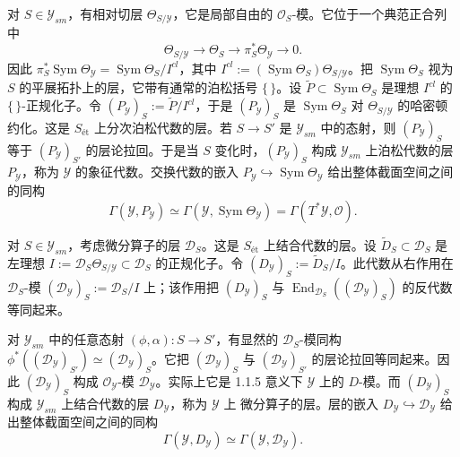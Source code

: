 对 $S\in\mathcal{Y}_{sm}$，有相对切层 $\Theta_{S/\mathcal{Y}}$，它是局部自由的 $\mathcal{O}_S$-模。它位于一个典范正合列中
\[
\Theta_{S/\mathcal{Y}}\to\Theta_S\to\pi_S^{*}\Theta_{\mathcal{Y}}\to 0.
\]
因此 $\pi_S^{*}\operatorname{Sym}\Theta_{\mathcal{Y}}=\operatorname{Sym}\Theta_S/I^{cl}$，其中 $I^{cl}:=(\operatorname{Sym}\Theta_S)\Theta_{S/\mathcal{Y}}$。把 $\operatorname{Sym}\Theta_S$ 视为 $S$ 的平展拓扑上的层，它带有通常的泊松括号 $\{\,\}$。设 $\tilde{P}\subset\operatorname{Sym}\Theta_S$ 是理想 $I^{cl}$ 的 $\{\,\}$-正规化子。令 $(P_{\mathcal{Y}})_S:=\tilde{P}/I^{cl}$，于是 $(P_{\mathcal{Y}})_S$ 是 $\operatorname{Sym}\Theta_S$ 对 $\Theta_{S/\mathcal{Y}}$ 的哈密顿约化。这是 $S_{\text{ét}}$ 上分次泊松代数的层。若 $S\to S'$ 是 $\mathcal{Y}_{sm}$ 中的态射，则 $(P_{\mathcal{Y}})_S$ 等于 $(P_{\mathcal{Y}})_{S'}$ 的层论拉回。于是当 $S$ 变化时，$(P_{\mathcal{Y}})_S$ 构成 $\mathcal{Y}_{sm}$ 上泊松代数的层 $P_{\mathcal{Y}}$，称为 $\mathcal{Y}$ 的象征代数。交换代数的嵌入 $P_{\mathcal{Y}}\hookrightarrow\operatorname{Sym}\Theta_{\mathcal{Y}}$ 给出整体截面空间之间的同构
\begin{equation}\tag{5}
\Gamma(\mathcal{Y},P_{\mathcal{Y}})\simeq\Gamma(\mathcal{Y},\operatorname{Sym}\Theta_{\mathcal{Y}})=\Gamma(T^{*}\mathcal{Y},\mathcal{O}).
\end{equation}

 对 $S\in\mathcal{Y}_{sm}$，考虑微分算子的层 $\mathcal{D}_S$。这是 $S_{\text{ét}}$ 上结合代数的层。设 $\tilde{D}_S\subset\mathcal{D}_S$ 是左理想 $I:=\mathcal{D}_S\Theta_{S/\mathcal{Y}}\subset\mathcal{D}_S$ 的正规化子。令 $(D_{\mathcal{Y}})_S:=\tilde{D}_S/I$。此代数从右作用在 $\mathcal{D}_S$-模 $(\mathcal{D}_{\mathcal{Y}})_S:=\mathcal{D}_S/I$ 上；该作用把 $(D_{\mathcal{Y}})_S$ 与 $\operatorname{End}_{\mathcal{D}_S}((\mathcal{D}_{\mathcal{Y}})_S)$ 的反代数等同起来。

对 $\mathcal{Y}_{sm}$ 中的任意态射 $(\phi,\alpha):S\to S'$，有显然的 $\mathcal{D}_S$-模同构 $\phi^{*}((\mathcal{D}_{\mathcal{Y}})_{S'})\simeq(\mathcal{D}_{\mathcal{Y}})_S$。它把 $(\mathcal{D}_{\mathcal{Y}})_S$ 与 $(\mathcal{D}_{\mathcal{Y}})_{S'}$ 的层论拉回等同起来。因此 $(\mathcal{D}_{\mathcal{Y}})_S$ 构成 $\mathcal{O}_{\mathcal{Y}}$-模 $\mathcal{D}_{\mathcal{Y}}$。实际上它是 1.1.5 意义下 $\mathcal{Y}$ 上的 $D$-模。而 $(D_{\mathcal{Y}})_S$ 构成 $\mathcal{Y}_{sm}$ 上结合代数的层 $D_{\mathcal{Y}}$，称为 $\mathcal{Y}$ 上%
微分算子的层。层的嵌入 $D_{\mathcal{Y}}\hookrightarrow\mathcal{D}_{\mathcal{Y}}$ 给出整体截面空间之间的同构
\begin{equation}\tag{6}
\Gamma(\mathcal{Y},D_{\mathcal{Y}})\simeq\Gamma(\mathcal{Y},\mathcal{D}_{\mathcal{Y}}).
\end{equation}

